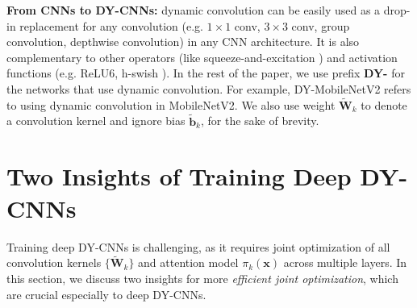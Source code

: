 \documentclass[10pt,twocolumn,letterpaper]{article}
\begin{document}
\noindent \textbf{From CNNs to DY-CNNs:} dynamic convolution can be easily used as a drop-in replacement for any convolution (e.g. $1\times1$ conv, $3\times3$ conv, group convolution, depthwise convolution) in any CNN architecture. It is also complementary to other operators (like squeeze-and-excitation \cite{Hu_2018_CVPR}) and activation functions (e.g. ReLU6, h-swish \cite{howard2019mbnetv3}). In the rest of the paper, we use prefix \textbf{DY-} for the networks that use dynamic convolution. For example, DY-MobileNetV2 refers to using dynamic convolution in MobileNetV2. We also use weight $\bm{\tilde{W}}_k$ to denote a convolution kernel and ignore bias $\bm{\tilde{b}}_k$, for the sake of brevity.
\section{Two Insights of Training Deep DY-CNNs}
Training deep DY-CNNs is challenging, as it requires joint optimization of all convolution kernels $\{\bm{\tilde{W}}_k\}$ and attention model $\pi_k(\bm{x})$ across multiple layers. In this section, we discuss two insights for more \textit{efficient joint optimization}, which are crucial especially to deep DY-CNNs. %

\end{document}
